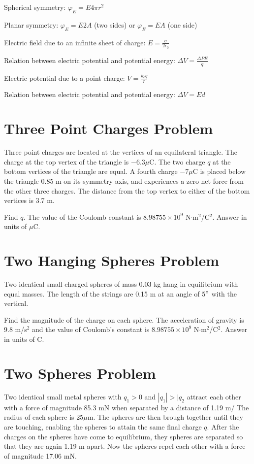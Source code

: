 \documentclass[../physics12.tex]{subfiles}
\begin{document}
Spherical symmetry: $\varphi_E = E4\pi r^2$

Planar symmetry: $\varphi_E = E2A$ (two sides) or $\varphi_E = EA$ (one side)

Electric field due to an infinite sheet of charge: $E=\frac{\sigma}{2\epsilon_0}$

Relation between electric potential and potential energy: $\Delta V = \frac{\Delta PE}{q}$

Electric potential due to a point charge: $V=\frac{k_e q}{r}$

Relation between electric potential and potential energy: $\Delta V = Ed$

\section{Three Point Charges Problem}
Three point charges are located at the vertices of an equilateral triangle. The charge at the top vertex of the triangle is $-6.3\mu$C. The two charge $q$ at the bottom vertices of the 
triangle are equal. A fourth charge $-7\mu$C is placed below the triangle 0.85 m on its symmetry-axis, and experiences a zero net force from the other three charges. The distance from the top vertex to either of the bottom vertices is 3.7 m.

Find $q$. The value of the Coulomb constant is $8.98755\times 10^9$ N$\cdot$m$^2$/C$^2$. Answer in units of $\mu$C.

\section{Two Hanging Spheres Problem}
Two identical small charged spheres of mass 0.03 kg hang in equilibrium with equal masses. The length of the strings are 0.15 m at an angle of 5$\degree$ with the vertical.

Find the magnitude of the charge on each sphere. The acceleration of gravity is 9.8 m/s$^2$ and the value of Coulomb's constant is $8.98755\times 10^9$ N$\cdot$m$^2$/C$^2$. Answer in units of C.

\section{Two Spheres Problem}
Two identical small metal spheres with $q_1>0$ and $|q_1|>|q_2$ attract each other with a force of magnitude 85.3 mN when separated by a distance of 1.19 m/ The radius of each sphere is 25$\mu$m. The spheres are then brough together until they are touching, enabling the spheres to attain the same final charge $q$.
After the charges on the spheres have come to equilibrium, they spheres are separated so that they are again 1.19 m apart. Now the spheres repel each other with a force of magnitude 17.06 mN.
\end{document}
